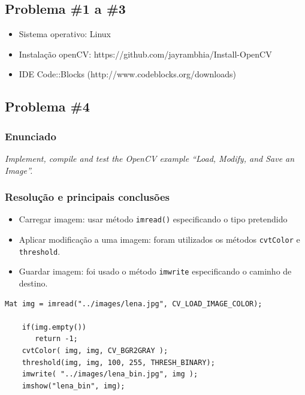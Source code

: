 \documentclass[portuguese, times, mirror]{revdetua}
\begin{document}
\subsection{Problema \#1 a \#3}

\begin{itemize}
    \item Sistema operativo: Linux
    \item Instalação openCV: https://github.com/jayrambhia/Install-OpenCV
    \item IDE Code::Blocks (http://www.codeblocks.org/downloads)
\end{itemize}

\subsection{Problema \#4}

\subsubsection{Enunciado}
\textit{ Implement, compile and test the OpenCV example “Load, Modify, and Save an Image”.}

\subsubsection{Resolução e principais conclusões}


\begin{itemize}
    \item Carregar imagem: usar método \texttt{imread()} especificando o tipo pretendido 
    \item Aplicar modificação a uma imagem: foram utilizados os métodos \texttt{cvtColor} e \texttt{threshold}.   
    \item Guardar imagem: foi usado o método \texttt{imwrite} especificando o caminho de destino. 
\end{itemize}


\begin{lstlisting}[caption=Proposta de resolução do exercício 4,label=code:C]
    Mat img = imread("../images/lena.jpg", CV_LOAD_IMAGE_COLOR);
    
    if(img.empty())
       return -1;
    cvtColor( img, img, CV_BGR2GRAY );
    threshold(img, img, 100, 255, THRESH_BINARY);
    imwrite( "../images/lena_bin.jpg", img );
    imshow("lena_bin", img);
\end{lstlisting}
\end{document}
